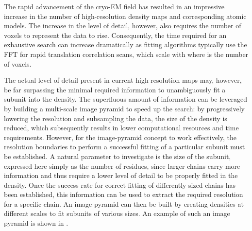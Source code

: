 {}

The rapid advancement of the cryo-EM field has resulted in an impressive
increase in the number of high-resolution density maps and corresponding atomic
models. The increase in the level of detail, however, also requires the number
of voxels to represent the data to rise. Consequently, the time required for an
exhaustive search can increase dramatically as fitting algorithms typically use
the FFT for rapid translation correlation scans, which scale with  where
 is the number of voxels. 

The actual level of detail present in current high-resolution maps may,
however, be far surpassing the minimal required information to unambiguously
fit a subunit into the density. The superfluous amount of information can be
leveraged by building a multi-scale image pyramid to speed up the search: by
progressively lowering the resolution and subsampling the data, the size of the
density is reduced, which subsequently results in lower computational resources
and time requirements. However, for the image-pyramid concept to work
effectively, the resolution boundaries to perform a successful fitting of a
particular subunit must be established. A natural parameter to investigate is
the size of the subunit, expressed here simply as the number of residues, since
larger chains carry more information and thus require a lower level of detail
to be properly fitted in the density. Once the success rate for correct fitting
of differently sized chains has been established, this information can be used
to extract the required resolution for a specific chain. An image-pyramid can
then be built by creating densities at different scales to fit subunits of
various sizes. An example of such an image pyramid is shown in
.

